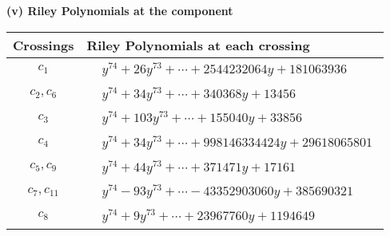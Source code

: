 \documentclass[1p]{elsarticle_modified}
\theoremstyle{definition}
\begin{document}
\newpage\renewcommand{\arraystretch}{1}
\flushleft \textbf{(v) Riley Polynomials at the component}\newline \\
\begin{tabular}{m{50pt}|m{274pt}}
Crossings & \hspace{64pt}Riley Polynomials at each crossing \\
\hline $$\begin{aligned}c_{1}\end{aligned}$$&$\begin{aligned}
&y^{74}+26 y^{73}+\cdots+2544232064 y+181063936
\end{aligned}$\\
\hline $$\begin{aligned}c_{2},c_{6}\end{aligned}$$&$\begin{aligned}
&y^{74}+34 y^{73}+\cdots+340368 y+13456
\end{aligned}$\\
\hline $$\begin{aligned}c_{3}\end{aligned}$$&$\begin{aligned}
&y^{74}+103 y^{73}+\cdots+155040 y+33856
\end{aligned}$\\
\hline $$\begin{aligned}c_{4}\end{aligned}$$&$\begin{aligned}
&y^{74}+34 y^{73}+\cdots+998146334424 y+29618065801
\end{aligned}$\\
\hline $$\begin{aligned}c_{5},c_{9}\end{aligned}$$&$\begin{aligned}
&y^{74}+44 y^{73}+\cdots+371471 y+17161
\end{aligned}$\\
\hline $$\begin{aligned}c_{7},c_{11}\end{aligned}$$&$\begin{aligned}
&y^{74}-93 y^{73}+\cdots-43352903060 y+385690321
\end{aligned}$\\
\hline $$\begin{aligned}c_{8}\end{aligned}$$&$\begin{aligned}
&y^{74}+9 y^{73}+\cdots+23967760 y+1194649
\end{aligned}$\\

\end{tabular}
\end{document}
